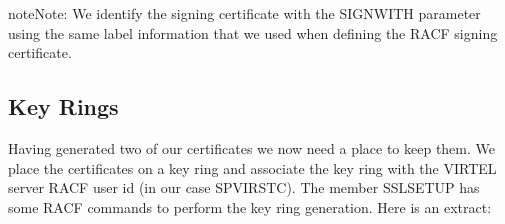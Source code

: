 \documentclass[letterpaper,10pt,english]{sphinxmanual}
\begin{document}
\begin{sphinxVerbatim}[commandchars=\\\{\}]
       
  
  
   
  
    
    
    
    
  
\end{sphinxVerbatim}

\begin{sphinxadmonition}{note}{Note:}
We identify the signing certificate with the SIGNWITH parameter using the same label information that we used when defining the RACF signing certificate.
\end{sphinxadmonition}


\subsection{Key Rings}
\label{\detokenize{TN202002:key-rings}}
Having generated two of our certificates we now need a place to keep them. We place the certificates on a key ring and associate the key ring with the VIRTEL server RACF user id (in our case SPVIRSTC). The member SSLSETUP has some RACF commands to perform the key ring generation. Here is an extract:
\end{document}
